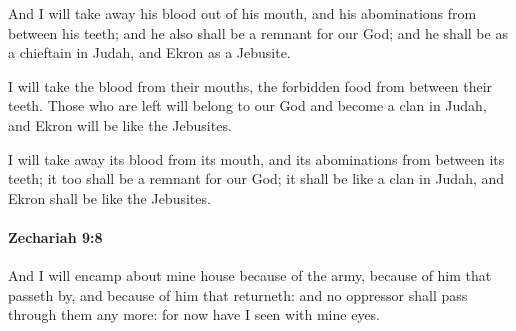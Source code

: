 			\begin{versebox}
					\item[BHS] 
					\item[LXX] 
					\item[ASV] And I will take away his blood out of his mouth, and his abominations from between his teeth; and he also shall be a remnant for our God; and he shall be as a chieftain in Judah, and Ekron as a Jebusite.
					\item[NIV] I will take the blood from their mouths, the forbidden food from between their teeth. Those who are left will belong to our God and become a clan in Judah, and Ekron will be like the Jebusites.
					\item[NRSV] I will take away its blood from its mouth, and its abominations from between its teeth; it too shall be a remnant for our God; it shall be like a clan in Judah, and Ekron shall be like the Jebusites.
			\end{versebox}

		\paragraph{Zechariah 9:8} %
			\label{ZECHARIAH-9-8}

			And I will encamp about mine house because of the army, because of him that passeth by, and because of him that returneth: and no oppressor shall pass through them any more: for now have I seen with mine eyes.

